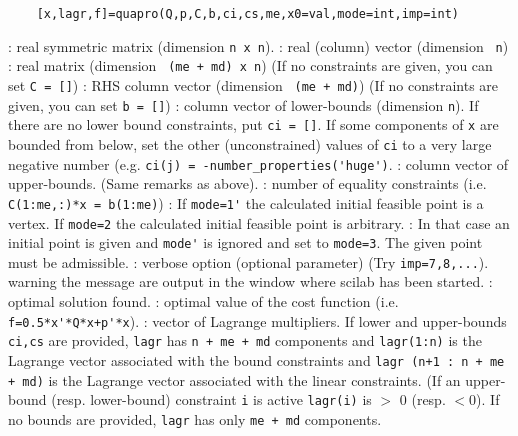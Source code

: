 
\begin{mandesc}
\end{mandesc}
\label{quapro}
\begin{calling_sequence}
  \begin{verbatim}
    [x,lagr,f]=quapro(Q,p,C,b,ci,cs,me,x0=val,mode=int,imp=int)  
  \end{verbatim}
\end{calling_sequence}
\begin{parameters}
  \begin{varlist}
    : real symmetric matrix (dimension \verb!n x n!).
    : real (column) vector (dimension \verb! n!)
    : real matrix (dimension \verb! (me + md) x n!) (If no constraints are given, you can set \verb!C = []!)
    : RHS column vector (dimension \verb! (me + md)!) (If no constraints are given, you can set \verb!b = []!)
    : column vector of lower-bounds (dimension \verb!n!). If there are no lower bound constraints, put \verb!ci = []!. 
    If some components of \verb!x! are bounded from below, set the other (unconstrained) values of \verb!ci! to a very  
    large negative number (e.g. \verb!ci(j) = -number_properties('huge')!.
   : column vector of upper-bounds. (Same remarks as above).
   : number of equality constraints (i.e. \verb!C(1:me,:)*x = b(1:me)!)
   : If \verb!mode=1'! the calculated initial feasible point is a vertex. If \verb!mode=2! the calculated initial feasible point is arbitrary.
   : In that case an initial point is given and \verb!mode'! is ignored and set to \verb!mode=3!. The given point must be admissible.
   : verbose option (optional parameter)   (Try \verb!imp=7,8,...!). warning the message are output in the window where scilab has been started.
   : optimal solution found.
   : optimal value of the cost function (i.e. \verb!f=0.5*x'*Q*x+p'*x!).
   : vector of Lagrange multipliers.  If lower and upper-bounds \verb!ci,cs! are provided, \verb!lagr! has 
   \verb!n + me + md! components and \verb!lagr(1:n)! is the Lagrange  vector associated with the bound 
   constraints and  \verb!lagr (n+1 : n + me + md)! is the Lagrange vector associated  
   with the linear constraints. (If an upper-bound (resp. lower-bound) constraint \verb!i! is active 
   \verb!lagr(i)! is $>$ 0 (resp. $<$0). If no bounds are provided, \verb!lagr! has only \verb!me + md! components.
  \end{varlist}
\end{parameters}

